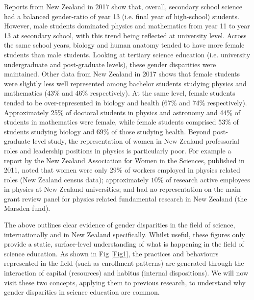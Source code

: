 Reports from New Zealand in 2017 show that, overall, secondary school science had a balanced gender-ratio of year 13 (i.e. final year of high-school) students.\cite{EducationCounts_2016a} However, male students dominated physics and mathematics from year 11 to year 13 at secondary school, with this trend being reflected at university level.\cite{EducationCounts_2016a} Across the same school years, biology and human anatomy tended to have more female students than male students. Looking at tertiary science education (i.e. university undergraduate and post-graduate levels), these gender disparities were maintained.\cite{EducationCounts_2016a} Other data from New Zealand in 2017 shows that female students were slightly less well represented among bachelor students studying physics and mathematics (43\% and 46\% respectively).\cite{EducationCounts_2016b} At the same level, female students tended to be over-represented in biology and health (67\% and 74\% respectively).\cite{EducationCounts_2016b} Approximately 25\% of doctoral students in physics and astronomy and 44\% of students in mathematics were female, while female students comprised 53\% of students studying biology and 69\% of those studying health. Beyond post-graduate level study, the representation of women in New Zealand professorial roles and leadership positions in physics is particularly poor. For example a report by the New Zealand Association for Women in the Sciences, published in 2011, noted that women were only $29\%$ of workers employed in physics related roles (New Zealand census data); approximately $10\%$ of research active employees in physics at New Zealand universities; and had no representation on the main grant review panel for physics related fundamental research in New Zealand (the Marsden fund).\cite{Bray_2011}

The above outlines clear evidence of gender disparities in the field of science, internationally and in New Zealand specifically. Whilst useful, these figures only provide a static, surface-level understanding of what is happening in the field of science education. As shown in Fig \ref{Fig1}, the practices and behaviours represented in the field (such as enrollment patterns) are generated through the interaction of capital (resources) and habitus (internal dispositions). We will now visit these two concepts, applying them to previous research, to understand why gender disparities in science education are common.   

